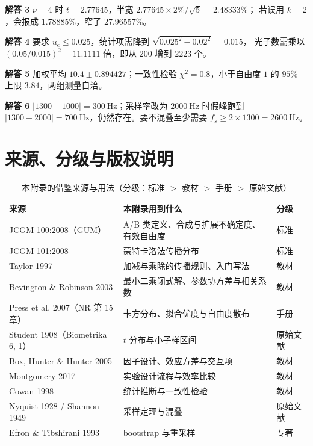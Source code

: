 \textbf{解答 3}
$\nu=4$ 时 $t=2.77645$，半宽 $2.77645\times2\%/\sqrt{5}=2.48333\%$；
若误用 $k=2$，会报成 $1.78885\%$，窄了 $27.96557\%$。

\textbf{解答 4}
要求 $u_\mathrm{c}\le0.025$，统计项需降到 $\sqrt{0.025^2-0.02^2}=0.015$，
光子数需乘以 $(0.05/0.015)^2=11.1111$ 倍，即从 $200$ 增到 $2223$ 个。

\textbf{解答 5}
加权平均 $10.4\pm0.894427$；一致性检验 $\chi^2=0.8$，小于自由度 $1$ 的 $95\%$
上限 $3.84$，两组测量自洽。

\textbf{解答 6}
$|1300-1000|=300\ \mathrm{Hz}$；采样率改为 $2000\ \mathrm{Hz}$ 时假峰跑到
$|1300-2000|=700\ \mathrm{Hz}$，仍然存在。要不混叠至少需要
$f_s\ge2\times1300=2600\ \mathrm{Hz}$。

\section{来源、分级与版权说明}
\label{sec:app-au-source}

\begingroup\small

\begin{table}[htbp]
\centering
\small
\caption{本附录的借鉴来源与用法（分级：标准 $>$ 教材 $>$ 手册 $>$ 原始文献）}
\label{tab:app-au-source}
\begin{tabular}{p{3.8cm}p{8.0cm}p{2.8cm}}
\hline
来源 & 本附录用到什么 & 分级 \\
\hline
JCGM 100:2008（GUM） & A/B 类定义、合成与扩展不确定度、有效自由度 & 标准 \\
JCGM 101:2008 & 蒙特卡洛法传播分布 & 标准 \\
Taylor 1997 & 加减与乘除的传播规则、入门写法 & 教材 \\
Bevington \& Robinson 2003 & 最小二乘闭式解、参数协方差与相关系数 & 教材 \\
Press et al. 2007（NR 第 15 章） & 卡方分布、拟合优度与自由度散布 & 手册 \\
Student 1908（Biometrika 6, 1） & $t$ 分布与小子样区间 & 原始文献 \\
Box, Hunter \& Hunter 2005 & 因子设计、效应方差与交互项 & 教材 \\
Montgomery 2017 & 实验设计流程与效率比较 & 教材 \\
Cowan 1998 & 统计推断与一致性检验 & 教材 \\
Nyquist 1928 / Shannon 1949 & 采样定理与混叠 & 原始文献 \\
Efron \& Tibshirani 1993 & bootstrap 与重采样 & 专著 \\
\hline
\end{tabular}
\end{table}

